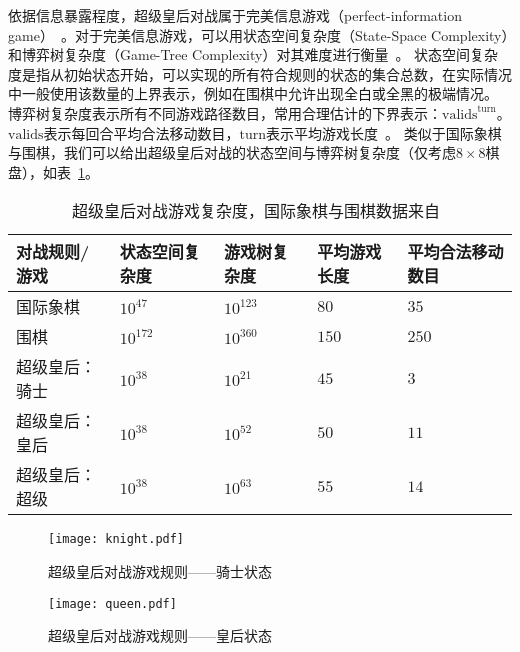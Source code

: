 依据信息暴露程度，超级皇后对战属于完美信息游戏（perfect-information game）~\cite{binmore2007game}。对于完美信息游戏，可以用状态空间复杂度（State-Space Complexity）和博弈树复杂度（Game-Tree Complexity）对其难度进行衡量~\cite{allis1994searching,VANDENHERIK2002277}。
状态空间复杂度是指从初始状态开始，可以实现的所有符合规则的状态的集合总数，在实际情况中一般使用该数量的上界表示，例如在围棋中允许出现全白或全黑的极端情况。
博弈树复杂度表示所有不同游戏路径数目，常用合理估计的下界表示：$\text{valids}^{\text{turn}}$。 $\text{valids}$表示每回合平均合法移动数目，$\text{turn}$表示平均游戏长度~\cite{10.1007/BF00992697}。
类似于国际象棋与围棋，我们可以给出超级皇后对战的状态空间与博弈树复杂度（仅考虑$8\times8$棋盘），如表~\ref{table:complexity}。
\begin{table}[htb]
  \centering
  \caption[complexity]{超级皇后对战游戏复杂度，国际象棋与围棋数据来自~\cite{enwiki:complexity}}
  \begin{tabular}{p{3cm}<{\centering} p{2cm}<{\centering} p{2cm}<{\centering} p{2cm}<{\centering} p{2cm}<{\centering}}
  \hline
  对战规则/游戏 & 状态空间复杂度 & 游戏树复杂度 & 平均游戏长度 & 平均合法移动数目 \\ \hline
  国际象棋 & $10^{47}$ & $10^{123}$&$80$ &$35$\\ 
      围棋 & $10^{172}$ & $10^{360}$&$150$ &$250$ \\ 
      超级皇后：骑士 & $10^{38}$ & $10^{21}$ &$45$ & $3$\\ 
      超级皇后：皇后 & $10^{38}$ & $10^{52}$ & $50$ & $11$\\ 
      超级皇后：超级 & $10^{38}$ & $10^{63}$ & $55$ & $14$\\ \hline
  \end{tabular}
  \label{table:complexity}
\end{table}

\begin{figure}[htb]
    \centering
    \texttt{[image: knight.pdf]}
    \caption[rules-knight]{%
        超级皇后对战游戏规则——骑士状态%
      }
    \label{fig:knight}
\end{figure}

\begin{figure}[htb]
    \centering
    \texttt{[image: queen.pdf]}
    \caption[rules-queen]{%
        超级皇后对战游戏规则——皇后状态%
      }
    \label{fig:queen}
\end{figure}


